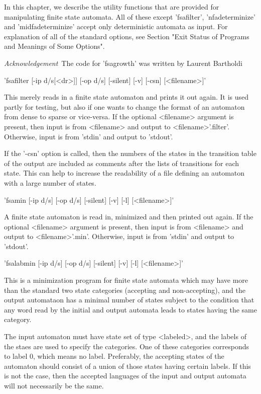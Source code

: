 In this chapter, we describe the utility functions that are provided for
manipulating finite state automata.
All of these except 'fsafilter', 'nfadeterminize' and 'midfadeterminize'
accept only deterministic automata as input.
For explanation of all of the standard options,
see Section "Exit Status of Programs and Meanings of Some Options".

{\em Acknowledgement}\:\ 
The code for 'fsagrowth' was written by Laurent Bartholdi


'fsafilter [-ip d/s[<dr>]] [-op d/s] [-silent] [-v] [-csn] [<filename>]'

This merely reads in a finite state automaton and prints it out again.
It is used partly for testing, but also if one wants to change the format
of an automaton from dense to sparse or vice-versa.
If the optional <filename> argument is present, then input is from <filename>
and output to <filename>'.filter'. Otherwise, input is from 'stdin' and
output to 'stdout'.

If the '-csn' option is called, then the numbers of the states in the
transition table of the output are included as comments after the lists
of transitions for each state. This can help to increase the readability
of a file defining an automaton with a large number of states.


'fsamin [-ip d/s] [-op d/s] [-silent] [-v] [-l] [<filename>]'

A finite state automaton is read in, minimized and then printed out again.
If the optional <filename> argument is present, then input is from <filename>
and output to <filename>'.min'. Otherwise, input is from 'stdin' and
output to 'stdout'.


'fsalabmin [-ip d/s] [-op d/s] [-silent] [-v] [-l] [<filename>]'

This is a minimization program for finite state automata which may have
more than the standard two state categories (accepting and non-accepting),
and the output automataon has a minimal number of states subject to
the condition that any word read by the initial and output automata
leads to states having the same category.

The input automaton must have state set of type  <labeled>, and the labels
of the staes are used to specify the categories. One of these categories
corresponds to label 0, which means no label. Preferably, the accepting states
of the automaton should consist of a union of those states having certain
labels. If this is not the case, then the accepted languages of the input
and output automata will not necessarily be the same.

